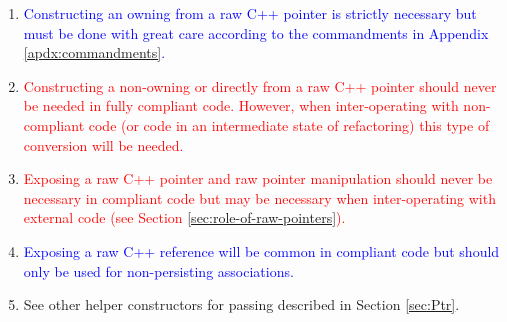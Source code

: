 {\begin{minipage}{\textwidth}
\begin{enumerate}
%
{}\item\label{conv:rcp-owning}\textcolor{blue}{Constructing an
owning {} from a raw C++ pointer is strictly necessary but
must be done with great care according to the commandments in Appendix
{}\ref{apdx:commandments}.}
%
{}\item\label{conv:rcp-nonowning}\textcolor{red}{Constructing a
non-owning {} or {} directly from a raw C++ pointer
should never be needed in fully compliant code.  However, when
inter-operating with non-compliant code (or code in an intermediate
state of refactoring) this type of conversion will be needed.}
%
{}\item\label{conv:obj-expose-raw-ptr}\textcolor{red}{Exposing a raw
C++ pointer and raw pointer manipulation should never be necessary in
compliant code but may be necessary when inter-operating with external
code (see Section {}\ref{sec:role-of-raw-pointers}).}
%
{}\item\label{conv:obj-expose-raw-ref}\textcolor{blue}{Exposing a
raw C++ reference will be common in compliant code but should only be
used for non-persisting associations.}
%
{}\item\label{conv:ptr-helpers} See other helper constructors for
passing {} described in Section {}\ref{sec:Ptr}.
%
\end{enumerate}

\end{minipage}}
